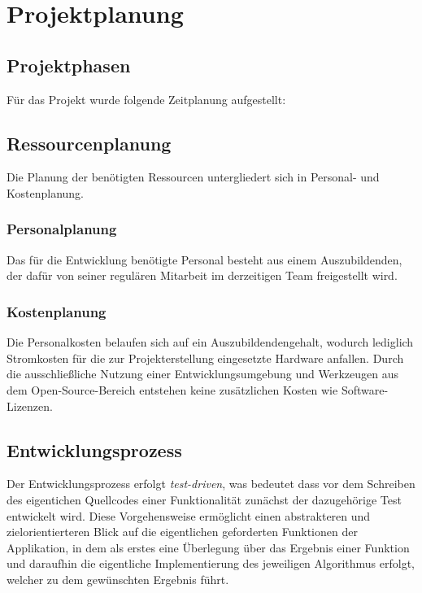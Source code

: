 \section{Projektplanung}
\label{sec:Projektplanung}


\subsection{Projektphasen}
\label{sec:Projektphasen}
Für das Projekt wurde folgende Zeitplanung aufgestellt:


\subsection{Ressourcenplanung}
\label{sec:Ressourcenplanung}
Die Planung der benötigten Ressourcen untergliedert sich in Personal- und Kostenplanung.
\subsubsection{Personalplanung}
\label{sec:Personalplanung}
Das für die Entwicklung benötigte Personal besteht aus einem Auszubildenden, der dafür von seiner
regulären Mitarbeit im derzeitigen Team freigestellt wird.
\subsubsection{Kostenplanung}
\label{sec:Kostenplanung}
Die Personalkosten belaufen sich auf ein Auszubildendengehalt, wodurch lediglich Stromkosten für die
zur Projekterstellung eingesetzte Hardware anfallen. Durch die ausschließliche Nutzung einer
Entwicklungsumgebung und Werkzeugen aus dem Open-Source-Bereich entstehen keine zusätzlichen Kosten
wie Software-Lizenzen.

\subsection{Entwicklungsprozess}
\label{sec:Entwicklungsprozess}
Der Entwicklungsprozess erfolgt \textit{test-driven}, was bedeutet dass vor dem Schreiben des eigentichen
Quellcodes einer Funktionalität zunächst der dazugehörige Test entwickelt wird. Diese Vorgehensweise
ermöglicht einen abstrakteren und zielorientierteren Blick auf die eigentlichen geforderten
Funktionen der Applikation, in dem als erstes eine Überlegung über das Ergebnis einer Funktion
und daraufhin die eigentliche Implementierung des jeweiligen Algorithmus erfolgt, welcher zu dem
gewünschten Ergebnis führt.

